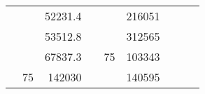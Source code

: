 \begin{table}[H]
\begin{tabular}{|ccrccrccc}
\multicolumn{1}{|c|}{\cellcolor[HTML]{FFFFC7}}                                & \multicolumn{1}{c|}{\cellcolor[HTML]{DAE8FC}}                      & \multicolumn{1}{r|}{\cellcolor[HTML]{DAE8FC}52231.4}   & \multicolumn{1}{c|}{\cellcolor[HTML]{FFFFC7}}                                & \multicolumn{1}{c|}{\cellcolor[HTML]{DAE8FC}}                       & \multicolumn{1}{r|}{\cellcolor[HTML]{DDFDFF}216051}    &                                                                              &                                                                    &                                                        \\ \cline{3-3} \cline{6-6}
\multicolumn{1}{|c|}{\cellcolor[HTML]{FFFFC7}}                                & \multicolumn{1}{c|}{\cellcolor[HTML]{DAE8FC}}                      & \multicolumn{1}{r|}{\cellcolor[HTML]{DDFDFF}53512.8}   & \multicolumn{1}{c|}{\cellcolor[HTML]{FFFFC7}}                                & \multicolumn{1}{c|}{\cellcolor[HTML]{DAE8FC}}                       & \multicolumn{1}{r|}{\cellcolor[HTML]{DAE8FC}312565}    &                                                                              &                                                                    &                                                        \\ \cline{3-3} \cline{6-6}
\multicolumn{1}{|c|}{\cellcolor[HTML]{FFFFC7}}                                & \multicolumn{1}{c|}{\cellcolor[HTML]{DAE8FC}}                      & \multicolumn{1}{r|}{\cellcolor[HTML]{DAE8FC}67837.3}   & \multicolumn{1}{c|}{\cellcolor[HTML]{FFFFC7}}                                & \multicolumn{1}{c|}{\multirow{-10}{*}{\cellcolor[HTML]{DAE8FC}75}}  & \multicolumn{1}{r|}{\cellcolor[HTML]{DDFDFF}103343}    &                                                                              &                                                                    &                                                        \\ \cline{3-3} \cline{5-6}
\multicolumn{1}{|c|}{\cellcolor[HTML]{FFFFC7}}                                & \multicolumn{1}{c|}{\multirow{-10}{*}{\cellcolor[HTML]{DAE8FC}75}} & \multicolumn{1}{r|}{\cellcolor[HTML]{DDFDFF}142030}    & \multicolumn{1}{c|}{\cellcolor[HTML]{FFFFC7}}                                & \multicolumn{1}{c|}{\cellcolor[HTML]{DDFDFF}}                       & \multicolumn{1}{r|}{\cellcolor[HTML]{DAE8FC}140595}    &                                                                              &                                                                    &                                                        \\ \cline{2-3} \cline{6-6}

\end{tabular}
\end{table}
